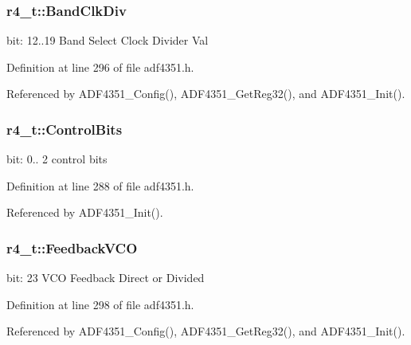 \subsubsection[{\texorpdfstring{Band\+Clk\+Div}{BandClkDiv}}]{ r4\+\_\+t\+::\+Band\+Clk\+Div}\hypertarget{structr4__t_af9bbf20145437bb5913e815a71cc3eb5}{}\label{structr4__t_af9bbf20145437bb5913e815a71cc3eb5}
bit\+: 12..19 Band Select Clock Divider Val 

Definition at line 296 of file adf4351.\+h.



Referenced by A\+D\+F4351\+\_\+\+Config(), A\+D\+F4351\+\_\+\+Get\+Reg32(), and A\+D\+F4351\+\_\+\+Init().

\subsubsection[{\texorpdfstring{Control\+Bits}{ControlBits}}]{ r4\+\_\+t\+::\+Control\+Bits}\hypertarget{structr4__t_a9f03fbb2e74ac5c97c73cd70755d95eb}{}\label{structr4__t_a9f03fbb2e74ac5c97c73cd70755d95eb}
bit\+: 0.. 2 control bits 

Definition at line 288 of file adf4351.\+h.



Referenced by A\+D\+F4351\+\_\+\+Init().

\subsubsection[{\texorpdfstring{Feedback\+V\+CO}{FeedbackVCO}}]{ r4\+\_\+t\+::\+Feedback\+V\+CO}\hypertarget{structr4__t_af070024e13538726836fc1c405aa0124}{}\label{structr4__t_af070024e13538726836fc1c405aa0124}
bit\+: 23 V\+CO Feedback Direct or Divided 

Definition at line 298 of file adf4351.\+h.



Referenced by A\+D\+F4351\+\_\+\+Config(), A\+D\+F4351\+\_\+\+Get\+Reg32(), and A\+D\+F4351\+\_\+\+Init().

